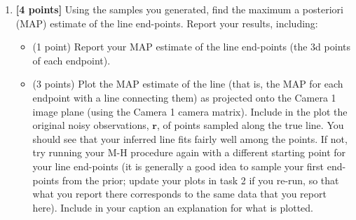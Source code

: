 \documentclass[10pt]{article}
\begin{document}
\begin{enumerate}
In your written answers for this task, including the following: 
\begin{itemize}
\item (3 points) Generate a plot like that of Figure 4.12(c), page 161 of FCML (2nd edition), for each parameter you are estimating, to view progress during sampling.  Remember, only plot the {\em accepted} samples, not the rejected samples. Provide informative captions.


\item (3 points) Describe the trends you see in these plots, and include an explanation of what they are telling you.  Expect to see some differences between the plots you generate and what you see in FCML Figure 4.12(c).


\end{itemize}

\item {\bf [4 points]} \label{task-c} Using the samples you generated, find the maximum a posteriori (MAP) estimate of the line end-points.
Report your results, including: 
\begin{itemize}
\item (1 point) Report your MAP estimate of the line end-points (the 3d points of each endpoint).


\item (3 points) Plot the MAP estimate of the line (that is, the MAP for each endpoint with a line connecting them) as projected onto the Camera 1 image plane (using the Camera 1 camera matrix). Include in the plot the original noisy observations, $\mathbf{r}$, of points sampled along the true line. You should see that your inferred line fits fairly well among the points. If not, try running your M-H procedure again with a different starting point for your line end-points (it is generally a good idea to sample your first end-points from the prior; update your plots in task 2 if you re-run, so that what you report there corresponds to the same data that you report here). Include in your caption an explanation for what is plotted.


\end{itemize}


\end{enumerate}
\end{document}
